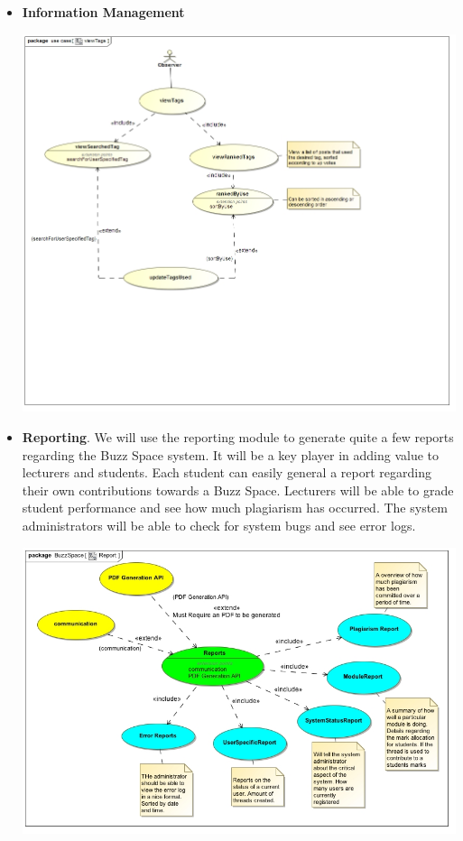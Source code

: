 \documentclass[a4paper,12pt]{report}
\begin{document}
\begin{itemize}
\begin{center}
		\end{center}
\item  \textbf{Information Management}
		\begin{center}
  	 	\includegraphics[width=1\textwidth] {../Herman/viewTags.jpg}\\[0.4cm]    
		\end{center}
\item \textbf{Reporting}. We will use the reporting module to generate quite a few reports regarding the Buzz Space system. It will be a key player in adding value to lecturers and students. Each student can easily general a report regarding their own contributions towards a Buzz Space. Lecturers will be able to grade student performance and see how much plagiarism has occurred. The system administrators will be able to check for system bugs and see error logs. 
		\begin{center}
  	 	\includegraphics[width=1\textwidth] {../Hanrich/Report.jpg}\\[0.4cm]    

\end{center}
\end{itemize}
\end{document}
